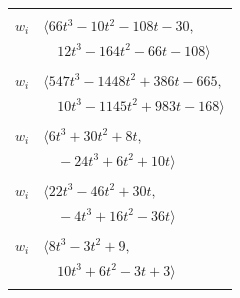 \documentclass[11pt]{article}
\begin{document}
\begin{longtable}{@{}ll@{}}
\addlinespace[2pt]
\multicolumn{2}{@{}p{0.97\textwidth}@{}}{$i=8$, $D_i=1$, $\rho_{ij}$: $1{:}1, \allowbreak 3{:}1, \allowbreak 5{:}2, \allowbreak 6{:}1, \allowbreak 10{:}1, \allowbreak 16{:}1, \allowbreak 21{:}2, \allowbreak 26{:}2, \allowbreak 29{:}1, \allowbreak 32{:}1, \allowbreak 36{:}1, \allowbreak 38{:}1, \allowbreak 60{:}1$}\\
$w_i$ & $\langle 66t^{3}-10t^{2}-108t-30,$\\
 & $\quad 12t^{3}-164t^{2}-66t-108\rangle$\\
\addlinespace[2pt]
\multicolumn{2}{@{}p{0.97\textwidth}@{}}{$i=9$, $D_i=1$, $\rho_{ij}$: $16{:}2, \allowbreak 18{:}1, \allowbreak 19{:}1, \allowbreak 24{:}1, \allowbreak 27{:}1, \allowbreak 34{:}2, \allowbreak 36{:}2, \allowbreak 37{:}2, \allowbreak 40{:}1, \allowbreak 47{:}1, \allowbreak 55{:}2, \allowbreak 60{:}2, \allowbreak 61{:}2$}\\
$w_i$ & $\langle 547t^{3}-1448t^{2}+386t-665,$\\
 & $\quad 10t^{3}-1145t^{2}+983t-168\rangle$\\
\addlinespace[2pt]
\multicolumn{2}{@{}p{0.97\textwidth}@{}}{$i=10$, $D_i=1$, $\rho_{ij}$: $5{:}2, \allowbreak 8{:}2, \allowbreak 13{:}1, \allowbreak 23{:}1, \allowbreak 61{:}1, \allowbreak 64{:}2$}\\
$w_i$ & $\langle 6t^{3}+30t^{2}+8t,$\\
 & $\quad -24t^{3}+6t^{2}+10t\rangle$\\
\addlinespace[2pt]
\multicolumn{2}{@{}p{0.97\textwidth}@{}}{$i=11$, $D_i=1$, $\rho_{ij}$: $0{:}1, \allowbreak 1{:}2, \allowbreak 19{:}1, \allowbreak 22{:}1, \allowbreak 32{:}1, \allowbreak 37{:}1, \allowbreak 55{:}1, \allowbreak 60{:}2, \allowbreak 65{:}2, \allowbreak 72{:}1, \allowbreak 77{:}2$}\\
$w_i$ & $\langle 22t^{3}-46t^{2}+30t,$\\
 & $\quad -4t^{3}+16t^{2}-36t\rangle$\\
\addlinespace[2pt]
\multicolumn{2}{@{}p{0.97\textwidth}@{}}{$i=12$, $D_i=1$, $\rho_{ij}$: $2{:}2, \allowbreak 13{:}2, \allowbreak 19{:}2, \allowbreak 20{:}1, \allowbreak 23{:}1, \allowbreak 38{:}1, \allowbreak 40{:}1, \allowbreak 44{:}1, \allowbreak 56{:}1, \allowbreak 60{:}2$}\\
$w_i$ & $\langle 8t^{3}-3t^{2}+9,$\\
 & $\quad 10t^{3}+6t^{2}-3t+3\rangle$\\
\addlinespace[2pt]
\multicolumn{2}{@{}p{0.97\textwidth}@{}}{$i=13$, $D_i=1$, $\rho_{ij}$: $6{:}1, \allowbreak 10{:}2, \allowbreak 12{:}1, \allowbreak 17{:}2, \allowbreak 34{:}1, \allowbreak 40{:}2, \allowbreak 55{:}2, \allowbreak 60{:}1, \allowbreak 62{:}2$}\\

\end{longtable}
\end{document}
